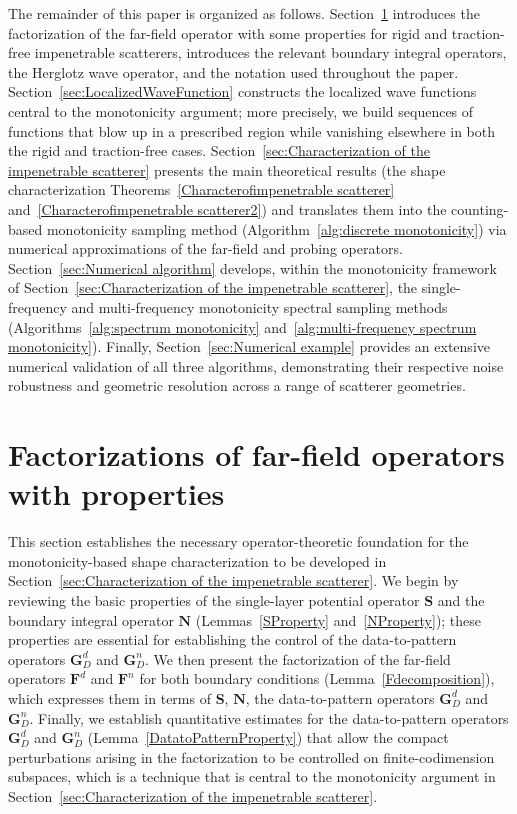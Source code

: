 \documentclass[11pt,reqno,twoside]{amsart}
\theoremstyle{definition}
\theoremstyle{remark}
\numberwithin{equation}{section}
\begin{document}
The remainder of this paper is organized as follows. Section~\ref{sec:far-field Operator decomposition} introduces the factorization of the far-field operator with some properties for rigid and traction-free impenetrable scatterers, introduces the relevant boundary integral operators, the Herglotz wave operator, and the notation used throughout the paper.
Section~\ref{sec:LocalizedWaveFunction} constructs the localized wave functions central to the monotonicity argument; more precisely, we build sequences of functions that blow up in a prescribed region while vanishing elsewhere in both the rigid and traction-free cases.
Section~\ref{sec:Characterization of the impenetrable scatterer} presents the main theoretical results (the shape characterization Theorems~\ref{Characterofimpenetrable scatterer} and~\ref{Characterofimpenetrable scatterer2}) and translates them into the counting-based monotonicity sampling method (Algorithm~\ref{alg:discrete monotonicity}) via numerical approximations of the far-field and probing operators.
Section~\ref{sec:Numerical algorithm} develops, within the monotonicity framework of Section~\ref{sec:Characterization of the impenetrable scatterer}, the single-frequency and multi-frequency monotonicity spectral sampling methods (Algorithms~\ref{alg:spectrum monotonicity} and~\ref{alg:multi-frequency spectrum monotonicity}). Finally, Section~\ref{sec:Numerical example} provides an extensive numerical validation of all three algorithms, demonstrating their respective noise robustness and geometric resolution across a range of scatterer geometries.

	
	
\section{Factorizations of far-field operators with properties}\label{sec:far-field Operator decomposition}
This section establishes the necessary operator-theoretic foundation for the monotonicity-based shape characterization to be developed in Section~\ref{sec:Characterization of the impenetrable scatterer}. We begin by reviewing the basic properties of the single-layer potential operator $\mathbf{S}$ and the boundary integral operator $\mathbf{N}$ (Lemmas~\ref{SProperty} and~\ref{NProperty}); these properties are essential  for establishing the control of the data-to-pattern operators $\mathbf{G}_D^d$ and $\mathbf{G}_D^n$. We then present the factorization of the far-field operators $\mathbf{F}^d$ and $\mathbf{F}^n$ for both boundary conditions (Lemma~\ref{Fdecomposition}), which expresses them in terms of $\mathbf{S}$, $\mathbf{N}$, the data-to-pattern operators $\mathbf{G}_D^d$ and $\mathbf{G}_D^n$. Finally, we establish quantitative estimates for the data-to-pattern operators $\mathbf{G}_D^d$ and $\mathbf{G}_D^n$ (Lemma~\ref{DatatoPatternProperty}) that allow the compact perturbations arising in the factorization to be controlled on finite-codimension subspaces, which is a technique that is central to the monotonicity argument in 
Section~\ref{sec:Characterization of the impenetrable scatterer}.
\end{document}
